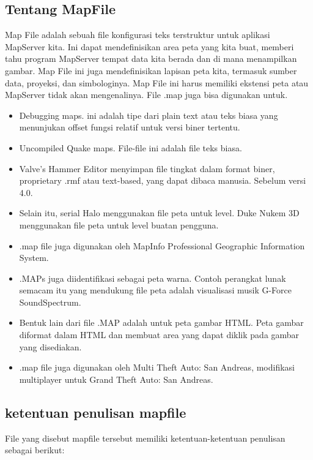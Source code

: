 \subsection{Tentang MapFile}
Map File adalah sebuah file konfigurasi teks terstruktur untuk aplikasi MapServer kita. Ini dapat mendefinisikan area peta yang kita buat, 
memberi tahu program MapServer tempat data kita berada dan di mana menampilkan gambar. 
Map File ini juga mendefinisikan lapisan peta kita, termasuk sumber data, proyeksi, dan simbologinya. 
Map File ini harus memiliki ekstensi peta atau MapServer tidak akan mengenalinya.
File .map juga bisa digunakan untuk.
\begin{itemize}
	\item Debugging maps. ini adalah tipe dari plain text atau teks biasa yang menunjukan offset fungsi relatif untuk versi biner tertentu.
	\item Uncompiled Quake maps. File-file ini adalah file teks biasa.
	\item Valve's Hammer Editor menyimpan file tingkat dalam format biner, proprietary .rmf atau text-based, yang dapat dibaca manusia. Sebelum versi 4.0.
	\item Selain itu, serial Halo menggunakan file peta untuk level. Duke Nukem 3D menggunakan file peta untuk level buatan pengguna.
	\item .map file juga digunakan oleh MapInfo Professional Geographic Information System.
	\item .MAPs juga diidentifikasi sebagai peta warna. Contoh perangkat lunak semacam itu yang mendukung file peta adalah visualisasi musik G-Force SoundSpectrum.
	\item Bentuk lain dari file .MAP adalah untuk peta gambar HTML. Peta gambar diformat dalam HTML dan membuat area yang dapat diklik pada gambar yang disediakan.
	\item .map file juga digunakan oleh Multi Theft Auto: San Andreas, modifikasi multiplayer untuk Grand Theft Auto: San Andreas.
\end{itemize}

\subsection{ketentuan penulisan mapfile}
File yang disebut mapfile tersebut memiliki ketentuan-ketentuan penulisan sebagai berikut:

